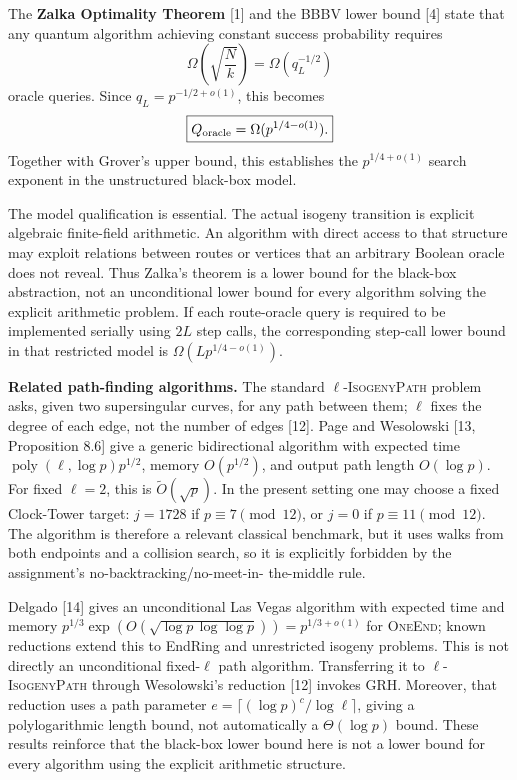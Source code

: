 \documentclass[10pt,a4paper]{article}
\begin{document}
The \textbf{Zalka Optimality Theorem} [1] and the BBBV lower bound [4] state that any quantum
algorithm achieving constant success probability requires
\[
\Omega\!\left(\sqrt{\frac Nk}\right)
=\Omega(q_L^{-1/2})
\]
oracle queries. Since \(q_L=p^{-1/2+o(1)}\), this becomes
\[
\boxed{Q_{\rm oracle}=\Omega(p^{1/4-o(1)}).}
\]
Together with Grover's upper bound, this establishes the
\(p^{1/4+o(1)}\) search exponent in the unstructured
black-box model.

The model qualification is essential. The actual isogeny
transition is explicit algebraic finite-field arithmetic.
An algorithm with direct access to that structure may exploit
relations between routes or vertices that an arbitrary
Boolean oracle does not reveal. Thus Zalka's theorem is a
lower bound for the black-box abstraction, not an
unconditional lower bound for every algorithm solving the
explicit arithmetic problem. If each route-oracle query is
required to be implemented serially using \(2L\) step calls,
the corresponding step-call lower bound in that restricted
model is \(\Omega(Lp^{1/4-o(1)})\).

{\footnotesize
\textbf{Related path-finding algorithms.} The standard $\ell$-\textsc{IsogenyPath}
problem asks, given two supersingular curves, for any path between them;
$\ell$ fixes the degree of each edge, not the number of edges [12]. Page and
Wesolowski [13, Proposition 8.6] give a generic bidirectional algorithm with
expected time $\operatorname{poly}(\ell,\log p) p^{1/2}$, memory
$O(p^{1/2})$, and output path length $O(\log p)$. For fixed $\ell=2$, this is
$\widetilde O(\sqrt p)$. In the present setting one may choose a fixed
Clock-Tower target: $j=1728$ if $p\equiv7\pmod{12}$, or $j=0$ if
$p\equiv11\pmod{12}$. The algorithm is therefore a relevant classical
benchmark, but it uses walks from both endpoints and a collision search, so
it is explicitly forbidden by the assignment's no-backtracking/no-meet-in-
the-middle rule.

Delgado [14] gives an unconditional Las Vegas algorithm with expected time
and memory $p^{1/3}\exp(O(\sqrt{\log p\,\log\log p}))=p^{1/3+o(1)}$ for
\textsc{OneEnd}; known reductions extend this to EndRing and unrestricted
isogeny problems. This is not directly an unconditional fixed-$\ell$ path
algorithm. Transferring it to $\ell$-\textsc{IsogenyPath} through Wesolowski's
reduction [12] invokes GRH. Moreover, that reduction uses a path parameter
$e=\lceil(\log p)^c/\log\ell\rceil$, giving a polylogarithmic length bound,
not automatically a $\Theta(\log p)$ bound. These results reinforce that the
black-box lower bound here is not a lower bound for every algorithm using the
explicit arithmetic structure.\par
}
\end{document}
